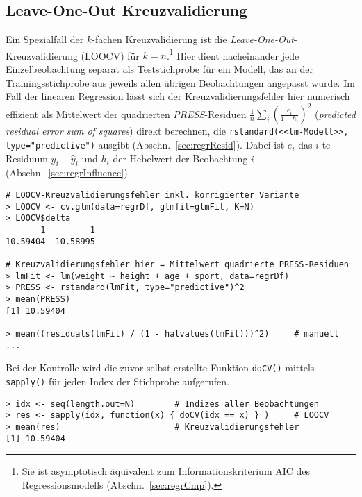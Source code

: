 \subsection{Leave-One-Out Kreuzvalidierung}
\label{sec:LOOCV}

Ein Spezialfall der $k$-fachen Kreuzvalidierung ist die \emph{Leave-One-Out}-Kreuzvalidierung (LOOCV) für $k = n$.\footnote{Sie ist asymptotisch äquivalent zum Informationskriterium AIC des Regressionsmodells (Abschn.\ \ref{sec:regrCmp}).} Hier dient nacheinander jede Einzelbeobachtung separat als Teststichprobe für ein Modell, das an der Trainingsstichprobe aus jeweils allen übrigen Beobachtungen angepasst wurde. Im Fall der linearen Regression lässt sich der Kreuzvalidierungsfehler hier numerisch effizient als Mittelwert der quadrierten \emph{PRESS}-Residuen $\frac{1}{n} \sum_{i}{\left(\frac{e_{i}}{1 - h_{i}}\right)^{2}}$ (\emph{predicted residual error sum of squares}) direkt berechnen, die \lstinline!rstandard(<<lm-Modell>>, type="predictive")! ausgibt (Abschn.\ \ref{sec:regrResid}). Dabei ist $e_{i}$ das $i$-te Residuum $y_{i} - \hat{y}_{i}$ und $h_{i}$ der Hebelwert der Beobachtung $i$ (Abschn.\ \ref{sec:regrInfluence}).
\begin{lstlisting}
# LOOCV-Kreuzvalidierungsfehler inkl. korrigierter Variante
> LOOCV <- cv.glm(data=regrDf, glmfit=glmFit, K=N)
> LOOCV$delta
       1         1
10.59404  10.58995

# Kreuzvalidierungsfehler hier = Mittelwert quadrierte PRESS-Residuen
> lmFit <- lm(weight ~ height + age + sport, data=regrDf)
> PRESS <- rstandard(lmFit, type="predictive")^2
> mean(PRESS)
[1] 10.59404

> mean((residuals(lmFit) / (1 - hatvalues(lmFit)))^2)     # manuell ...
\end{lstlisting}

Bei der Kontrolle wird die zuvor selbst erstellte Funktion \lstinline!doCV()! mittels \lstinline!sapply()! für jeden Index der Stichprobe aufgerufen.
\begin{lstlisting}
> idx <- seq(length.out=N)        # Indizes aller Beobachtungen
> res <- sapply(idx, function(x) { doCV(idx == x) } )     # LOOCV
> mean(res)                       # Kreuzvalidierungsfehler
[1] 10.59404
\end{lstlisting}

